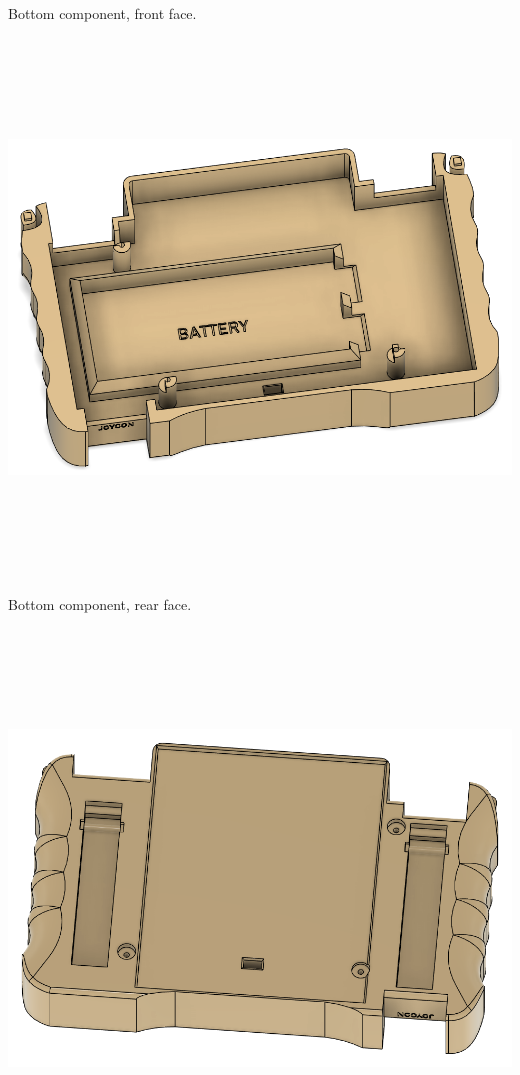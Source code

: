 Bottom component, front face. \newline
\includegraphics[width=15cm,height=15cm,keepaspectratio]{Figures/iteration4_bottom_front.png} \newline
Bottom component, rear face. \newline
\includegraphics[width=15cm,height=15cm,keepaspectratio]{Figures/iteration4_bottom_back.png}
\newpage